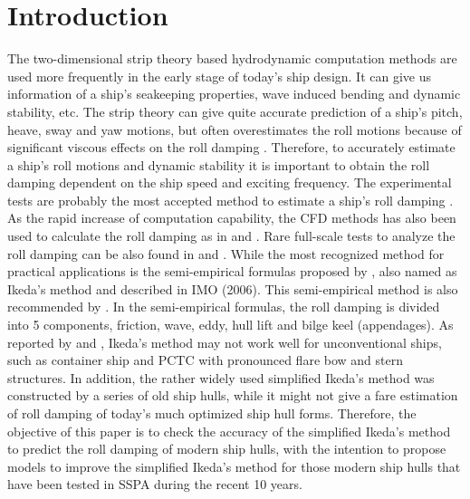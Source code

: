 \section{Introduction}
\label{se:introduction}

%    

The two-dimensional strip theory based hydrodynamic computation methods are used more frequently in the early stage of today's ship design. It can give us information of a ship's seakeeping properties, wave induced bending and dynamic stability, etc. The strip theory can give quite accurate prediction of a ship's pitch, heave, sway and yaw motions, but often overestimates the roll motions because of significant viscous effects on the roll damping \parencite{kawahara_simple_2011}. Therefore, to accurately estimate a ship's roll motions and dynamic stability it is important to obtain the roll damping dependent on the ship speed and exciting frequency. The experimental tests are probably the most accepted method to estimate a ship's roll damping \parencite{imo_1200_2006}. As the rapid increase of computation capability, the CFD methods has also been used to calculate the roll damping as in \parencite{kristiansen_experimental_2014} and \parencite{henry_peter_piehl_ship_2016}. Rare full-scale tests to analyze the roll damping can be also found in \parencite{schmitke_ship_1978} and \parencite{soder_assessment_2019}. While the most recognized method for practical applications is the semi-empirical formulas proposed by  \parencite{ikeda_eddy_1978,ikeda_components_1978,ikeda_roll_1979,ikeda_velocity_1979}, also named as Ikeda's method and described in IMO (2006). This semi-empirical method is also recommended by \parencite{ittc_ittc_2011}. In the semi-empirical formulas, the roll damping is divided into 5 components, friction, wave, eddy, hull lift and bilge keel (appendages). As reported by  \parencite{kawahara_simple_2011} and \parencite{soder_ikeda_2019}, Ikeda's method may not work well for unconventional ships, such as container ship and PCTC with pronounced flare bow and stern structures. In addition, the rather widely used simplified Ikeda's method \parencite{kawahara_simple_2011} was constructed by a series of old ship hulls, while it might not give a fare estimation of roll damping of today's much optimized ship hull forms. 
Therefore, the objective of this paper is to check the accuracy of the simplified Ikeda's method to predict the roll damping of modern ship hulls, with the intention to propose models to improve the simplified Ikeda's method for those modern ship hulls that have been tested in SSPA during the recent 10 years.

